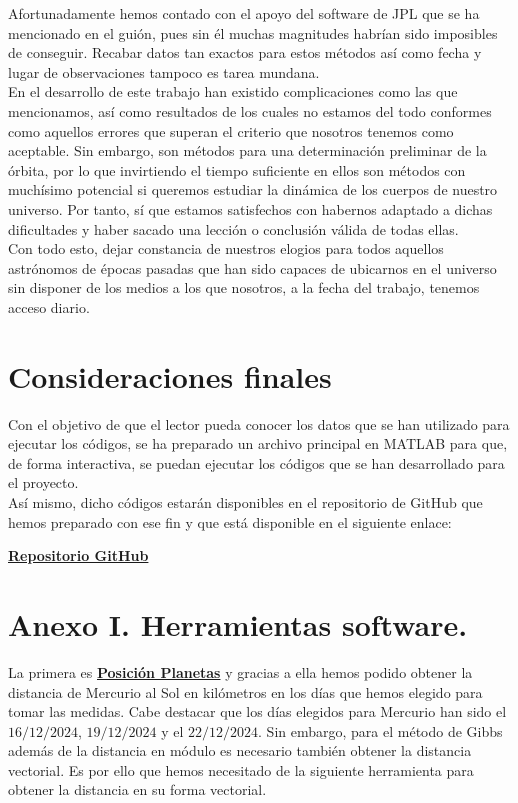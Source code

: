 \documentclass{article}
\numberwithin{equation}{section}
\begin{document}
Afortunadamente hemos contado con el apoyo del software de JPL que se ha mencionado en el guión, pues sin él muchas magnitudes habrían sido imposibles de conseguir. Recabar datos tan exactos para estos métodos así como fecha y lugar de observaciones tampoco es tarea mundana.\\

En el desarrollo de este trabajo han existido complicaciones como las que mencionamos, así como resultados de los cuales no estamos del todo conformes como aquellos errores que superan el criterio que nosotros tenemos como aceptable. Sin embargo, son métodos para una determinación preliminar de la órbita, por lo que invirtiendo el tiempo suficiente en ellos son métodos con muchísimo potencial si queremos estudiar la dinámica de los cuerpos de nuestro universo. Por tanto, sí que estamos satisfechos con habernos adaptado a dichas dificultades y haber sacado una lección o conclusión válida de todas ellas.\\ 

Con todo esto, dejar constancia de nuestros elogios para todos aquellos astrónomos de épocas pasadas que han sido capaces de ubicarnos en el universo sin disponer de los medios a los que nosotros, a la fecha del trabajo, tenemos acceso diario.

\section{Consideraciones finales}

Con el objetivo de que el lector pueda conocer los datos que se han utilizado para ejecutar los códigos, se ha preparado un archivo principal en MATLAB para que, de forma interactiva, se puedan ejecutar los códigos que se han desarrollado para el proyecto.\\

Así mismo, dicho códigos estarán disponibles en el repositorio de GitHub que hemos preparado con ese fin y que está disponible en el siguiente enlace:

\begin{center}
    \href{https://github.com/Nacho-88/Determinacion_de_orbitas}{\textbf{Repositorio GitHub}}
\end{center}

\section{Anexo I. Herramientas software.}

La primera es \href{https://www.tutiempo.net/astronomia/visor-astronomico/sistema-solar/}{\textbf{Posición Planetas}}
y gracias a ella hemos podido obtener la distancia de 
Mercurio al Sol en kilómetros en los días que hemos elegido 
para tomar las medidas. Cabe destacar que los días elegidos 
para Mercurio han sido el $16/12/2024$, $19/12/2024$ y el 
$22/12/2024$. Sin embargo, para el método de Gibbs además de 
la distancia en módulo es necesario también obtener la distancia 
vectorial. Es por ello que hemos necesitado de la siguiente herramienta 
para obtener la distancia en su forma vectorial. \\
\end{document}
